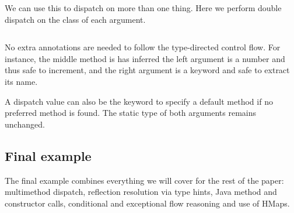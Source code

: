 We can use this to dispatch on more than one thing. Here we perform
double dispatch on the class of each argument.

\inputminted[firstline=6,lastline=23]{clojure}{code/demo/src/demo/eg7.clj}

No extra annotations are needed to follow the type-directed control flow.
For instance, the middle method is has inferred the left argument is a number
and thus safe to increment, and the right argument is a keyword and safe to
extract its name.

A dispatch value can also be the keyword  to specify a default
method if no preferred method is found. The static type of both arguments
remains unchanged.

\subsection{Final example}

The final example combines everything we will cover for the rest of the paper:
multimethod dispatch, reflection resolution via type hints, Java method
and constructor calls, conditional and exceptional flow reasoning
and use of HMaps.

\inputminted[firstline=6,lastline=20]{clojure}{code/demo/src/demo/eg8.clj}









